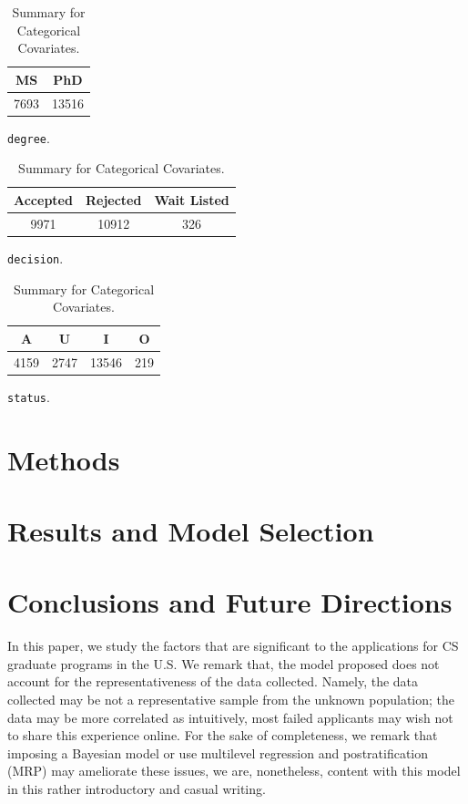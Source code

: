\documentclass{article}
\newcommand{\final}{0}
\newcommand{\var}[1]{\texttt{#1}}
\begin{document}
	\begin{table}[htpb]
	    \centering
	    \begin{subtable}{0.2\textwidth}\centering
	    \begin{tabular}{|c|c|}
		\hline
		MS & PhD \\\hline
		7693 & 13516 \\\hline
	    \end{tabular}
		\caption{\var{degree}.}
	    \end{subtable}%
	    \begin{subtable}{0.4\textwidth}\centering
	    \begin{tabular}{|c|c|c|}
		\hline
		Accepted & Rejected & Wait Listed \\\hline
		9971 & 10912 & 326 \\\hline
	    \end{tabular}
		\caption{\var{decision}.}
	    \end{subtable}%
	    \begin{subtable}{0.4\textwidth}\centering
	    \begin{tabular}{|c|c|c|c|}
		\hline
		A & U & I & O \\\hline
		4159 & 2747 & 13546 & 219 \\\hline
	    \end{tabular}
		\caption{\var{status}.}
	    \end{subtable}
	    \caption{Summary for Categorical Covariates.}
	    \label{table:data_summary:cat}
	\end{table}





\section{Methods} \label{sec:methods}

\section{Results and Model Selection} \label{sec:results}

\section{Conclusions and Future Directions} \label{sec:conclusions}

    In this paper, we study the factors that are significant
    to the applications for CS graduate programs in the U.S.
    We remark that, the model proposed does not account for
    the representativeness of the data collected. Namely,
    the data collected may be not a representative sample
    from the unknown population; the data may be more correlated
    as intuitively, most failed applicants may wish not to share
    this experience online. For the sake of completeness,
    we remark that imposing a Bayesian model or use multilevel
    regression and postratification (MRP) \cite{} may ameliorate
    these issues, we are, nonetheless, content with this model
    in this rather introductory and casual writing.

{\small
\nocite{*}


}
\ifthenelse{\equal{\final}{0}}
\end{document}
